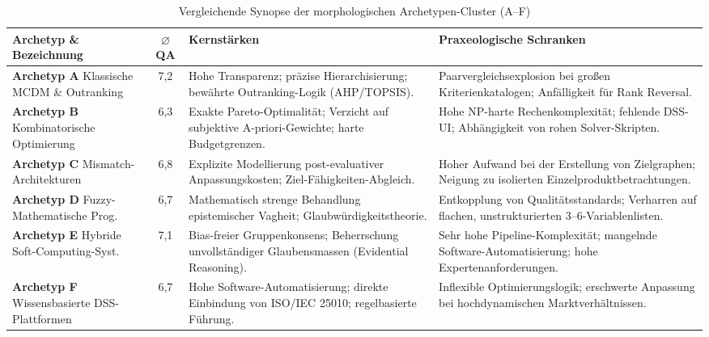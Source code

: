 \begin{table}[htbp]
\centering
\small
\caption{Vergleichende Synopse der morphologischen Archetypen-Cluster (A--F)}
\label{tab:archetypen_synopse}
\begin{tabularx}{\textwidth}{l c p{4.2cm} p{4.2cm}}
\toprule
\textbf{Archetyp \& Bezeichnung} & \textbf{$\varnothing$ QA} & \textbf{Kernstärken} & \textbf{Praxeologische Schranken} \\
\midrule
\textbf{Archetyp A} \newline Klassische MCDM \& Outranking & 7,2 & Hohe Transparenz; präzise Hierarchisierung; bewährte Outranking-Logik (AHP/TOPSIS). & Paarvergleichsexplosion bei großen Kriterienkatalogen; Anfälligkeit für Rank Reversal. \\
\addlinespace
\textbf{Archetyp B} \newline Kombinatorische Optimierung & 6,3 & Exakte Pareto-Optimalität; Verzicht auf subjektive A-priori-Gewichte; harte Budgetgrenzen. & Hohe NP-harte Rechenkomplexität; fehlende DSS-UI; Abhängigkeit von rohen Solver-Skripten. \\
\addlinespace
\textbf{Archetyp C} \newline Mismatch-Architekturen & 6,8 & Explizite Modellierung post-evaluativer Anpassungskosten; Ziel-Fähigkeiten-Abgleich. & Hoher Aufwand bei der Erstellung von Zielgraphen; Neigung zu isolierten Einzelproduktbetrachtungen. \\
\addlinespace
\textbf{Archetyp D} \newline Fuzzy-Mathematische Prog. & 6,7 & Mathematisch strenge Behandlung epistemischer Vagheit; Glaubwürdigkeitstheorie. & Entkopplung von Qualitätsstandards; Verharren auf flachen, unstrukturierten 3--6-Variablenlisten. \\
\addlinespace
\textbf{Archetyp E} \newline Hybride Soft-Computing-Syst. & 7,1 & Bias-freier Gruppenkonsens; Beherrschung unvollständiger Glaubensmassen (Evidential Reasoning). & Sehr hohe Pipeline-Komplexität; mangelnde Software-Automatisierung; hohe Expertenanforderungen. \\
\addlinespace
\textbf{Archetyp F} \newline Wissensbasierte DSS-Plattformen & 6,7 & Hohe Software-Automatisierung; direkte Einbindung von ISO/IEC 25010; regelbasierte Führung. & Inflexible Optimierungslogik; erschwerte Anpassung bei hochdynamischen Marktverhältnissen. \\
\bottomrule
\end{tabularx}
\end{table}

